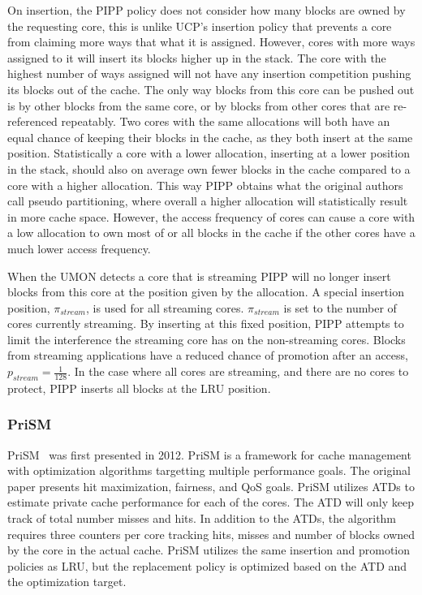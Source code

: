 On insertion, the PIPP policy does not consider how many blocks are owned by the requesting core, this is unlike UCP's insertion policy that prevents a core from claiming more ways that what it is assigned.
However, cores with more ways assigned to it will insert its blocks higher up in the stack. 
The core with the highest number of ways assigned will not have any insertion competition pushing its blocks out of the cache.
The only way blocks from this core can be pushed out is by other blocks from the same core, or by blocks from other cores that are re-referenced repeatably.
Two cores with the same allocations will both have an equal chance of keeping their blocks in the cache, as they both insert at the same position.
Statistically a core with a lower allocation, inserting at a lower position in the stack, should also on average own fewer blocks in the cache compared to a core with a higher allocation.
This way PIPP obtains what the original authors call pseudo partitioning, where overall a higher allocation will statistically result in more cache space.
However, the access frequency of cores can cause a core with a low allocation to own most of or all blocks in the cache if the other cores have a much lower access frequency.

When the UMON detects a core that is streaming PIPP will no longer insert blocks from this core at the position given by the allocation.
A special insertion position, $\pi_{stream}$, is used for all streaming cores.
$\pi_{stream}$ is set to the number of cores currently streaming. 
By inserting at this fixed position, PIPP attempts to limit the interference the streaming core has on the non-streaming cores.
Blocks from streaming applications have a reduced chance of promotion after an access, $p_{stream} = \frac{1}{128}$.
In the case where all cores are streaming, and there are no cores to protect, PIPP inserts all blocks at the LRU position.

\subsubsection{PriSM}

PriSM~\cite{Manikantan2012} was first presented in 2012.
PriSM is a framework for cache management with optimization algorithms targetting multiple performance goals.
The original paper presents hit maximization, fairness, and QoS goals.
PriSM utilizes ATDs to estimate private cache performance for each of the cores.
The ATD will only keep track of total number misses and hits.
In addition to the ATDs, the algorithm requires three counters per core tracking hits, misses and number of blocks owned by the core in the actual cache.
PriSM utilizes the same insertion and promotion policies as LRU, but the replacement policy is optimized based on the ATD and the optimization target.

